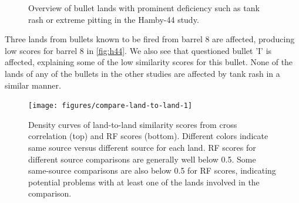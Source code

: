 \documentclass[doubleblind]{elsarticle}\usepackage[]{graphicx}\usepackage[]{color}
\newenvironment{knitrout}{}{} %
\begin{document}
\begin{knitrout}
\begin{figure}
\caption[Overview of bullet lands with prominent deficiency such as tank rash or extreme pitting in the Hamby-44 study]{Overview of bullet lands with prominent deficiency such as tank rash or extreme pitting in the Hamby-44 study.}\label{fig:tankrash}
\end{figure}


\end{knitrout}

Three lands from bullets known to be fired from barrel 8 are affected, producing low scores for barrel 8 in \autoref{fig:h44}. We also see that questioned bullet 'I' is affected, explaining some of the low similarity scores for this bullet.
None of the lands of any of the bullets in the other studies are affected by tank rash in a similar manner.










\begin{knitrout}
\color{fgcolor}\begin{figure}

{\centering \texttt{[image: figures/compare-land-to-land-1]} 

}

\caption[Density curves of land-to-land similarity scores from cross correlation (top) and RF scores (bottom)]{Density curves of land-to-land similarity scores from cross correlation (top) and RF scores (bottom). Different colors indicate same source versus different source for each land. RF scores for different source comparisons are generally well below 0.5. Some same-source comparisons are also below 0.5 for RF scores, indicating potential problems with at least one of the lands involved in the comparison.}\label{fig:compare-land-to-land}
\end{figure}


\end{knitrout}
\end{document}
